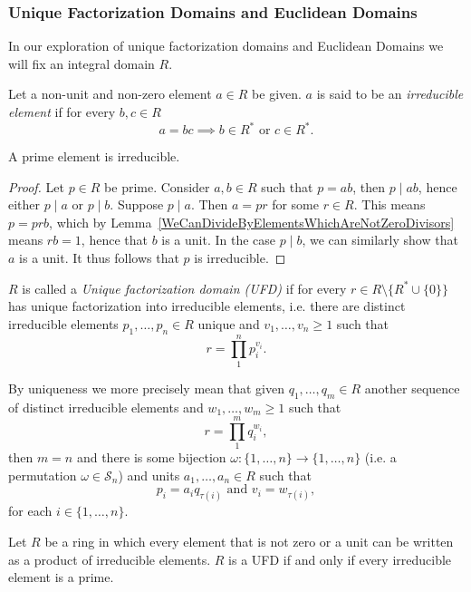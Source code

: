 \subsubsection{Unique Factorization Domains and Euclidean Domains}
In our exploration of unique factorization domains and Euclidean Domains we will fix an integral domain $R$.
\begin{definition}
    Let a non-unit and non-zero element $a\in R$ be given. $a$ is said to be an \textit{irreducible element} if for every $b,c\in R$
    $$a = bc \implies b\in R^\ast \text{ or } c \in R^\ast.$$
\end{definition}
\begin{lemma}
    A prime element is irreducible.
\end{lemma}
\begin{proof}
    Let $p\in R$ be prime. Consider $a,b\in R$ such that $p=ab$, then $p\mid ab$, hence either $p\mid a$ or $p\mid b$. Suppose $p\mid a$. Then $a = pr$ for some $r\in R$. This means $p = prb$, which by Lemma~\ref{WeCanDivideByElementsWhichAreNotZeroDivisors} means $rb = 1$, hence that $b$ is a unit. In the case $p\mid b$, we can similarly show that $a$ is a unit. It thus follows that $p$ is irreducible. 
\end{proof}
\begin{definition}
    $R$ is called a \textit{Unique factorization domain (UFD)} if for every $r\in R\setminus\{ R^\ast\cup \{0\}\}$ has unique factorization into irreducible elements, i.e. there are distinct irreducible elements $p_1,\dots,p_n\in R$ unique and $v_1,\dots,v_n\geq 1$ such that 
    $$r = \prod_1^n p_i^{v_i}.$$
\end{definition}
\begin{remark}
    By uniqueness we more precisely mean that given $q_1,\dots, q_m\in R$ another sequence of distinct irreducible elements and $w_1,\dots,w_m\geq 1$ such that 
    $$r = \prod_1^m q_i^{w_i},$$
    then $m=n$ and there is some bijection $\omega : \{1,\dots, n\} \rightarrow \{1,\dots,n\}$ (i.e. a permutation $\omega \in\mathcal{S}_n$) and units $a_1,\dots,a_n\in R$ such that 
    $$p_i = a_i q_{\tau(i)} \text{ and } v_i = w_{\tau(i)},$$
    for each $i\in\{1,\dots,n\}.$
\end{remark}
\begin{proposition}\label{EquivalentFormulationOfUFD}
    Let $R$ be a ring in which every element that is not zero or a unit can be written as a product of irreducible elements. $R$ is a UFD if and only if every irreducible element is a prime.
\end{proposition}
